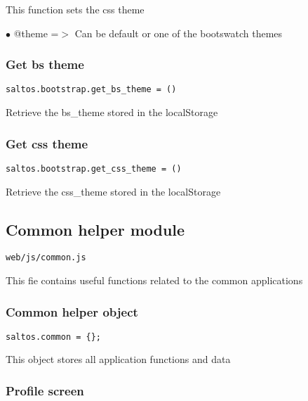 \documentclass[a4paper]{article}
\begin{document}
This function sets the css theme

\begin{compactitem}
\item[\color{myblue}$\bullet$] @theme =$>$ Can be default or one of the bootswatch themes
\end{compactitem}

\hypertarget{toc672}{}
\subsubsection{Get bs theme}

\begin{lstlisting}
saltos.bootstrap.get_bs_theme = ()
\end{lstlisting}

Retrieve the bs\_theme stored in the localStorage

\hypertarget{toc673}{}
\subsubsection{Get css theme}

\begin{lstlisting}
saltos.bootstrap.get_css_theme = ()
\end{lstlisting}

Retrieve the css\_theme stored in the localStorage

\hypertarget{toc674}{}
\subsection{Common helper module}

\begin{lstlisting}
web/js/common.js
\end{lstlisting}

This fie contains useful functions related to the common applications

\hypertarget{toc675}{}
\subsubsection{Common helper object}

\begin{lstlisting}
saltos.common = {};
\end{lstlisting}

This object stores all application functions and data

\hypertarget{toc676}{}
\subsubsection{Profile screen}
\end{document}
